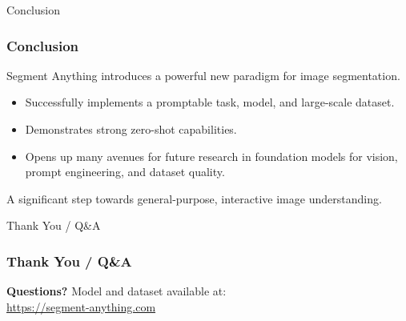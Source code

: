 \documentclass{beamer}
\begin{document}
\begin{frame}{Conclusion}
    \frametitle{Conclusion}
    Segment Anything introduces a powerful new paradigm for image segmentation.
    \begin{itemize}
        \item Successfully implements a promptable task, model, and large-scale dataset.
        \item Demonstrates strong zero-shot capabilities.
        \item Opens up many avenues for future research in foundation models for vision, prompt engineering, and dataset quality.
    \end{itemize}
    A significant step towards general-purpose, interactive image understanding.
\end{frame}

\begin{frame}{Thank You / Q&A}
    \frametitle{Thank You / Q\&A}
    \centering
    {\Large\textbf{Questions?}}
    \vfill
    Model and dataset available at: \\ \url{https://segment-anything.com}
\end{frame}
\end{document}
